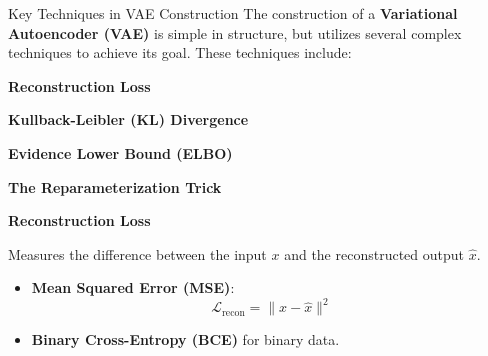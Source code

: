 \documentclass{beamer}
\begin{document}
\begin{frame}{Key Techniques in VAE Construction}
    The construction of a \textbf{Variational Autoencoder (VAE)} is simple in structure, but utilizes several complex techniques to achieve its goal. These techniques include:

    \vspace{1em}
    
    \begin{tcolorbox}[colback=blue!5!white, colframe=blue!75!black, fonttitle=\small, fontupper=\footnotesize]
        \textbf{Reconstruction Loss}
    \end{tcolorbox}

    \pause
    
    \begin{tcolorbox}[colback=teal!5!white, colframe=teal!75!black, fonttitle=\small, fontupper=\footnotesize]
        \textbf{Kullback-Leibler (KL) Divergence}
    \end{tcolorbox}

    \pause
    
    \begin{tcolorbox}[colback=purple!5!white, colframe=purple!75!black, fonttitle=\small, fontupper=\footnotesize]
        \textbf{Evidence Lower Bound (ELBO)}
    \end{tcolorbox}

    \pause

    \begin{tcolorbox}[colback=orange!5!white, colframe=orange!75!black, fonttitle=\small, fontupper=\footnotesize]
        \textbf{The Reparameterization Trick}
    \end{tcolorbox}
\end{frame}

\begin{frame}{\textbf{Reconstruction Loss}}
    \begin{tcolorbox}[colback=red!20!white, colframe=red!70!black, title=\textbf{Reconstruction Loss}]
        Measures the difference between the input \( x \) and the reconstructed output \( \hat{x} \).
    \end{tcolorbox}

    \pause

    \begin{tcolorbox}[colback=teal!10!white, colframe=teal!70!black, title=\textbf{Common Metrics}]
        \begin{itemize}
            \item \textbf{Mean Squared Error (MSE)}:
                \[
                \mathcal{L}_{\text{recon}} = \| x - \hat{x} \|^2
                \]
            \item \textbf{Binary Cross-Entropy (BCE)} for binary data.
        \end{itemize}
    \end{tcolorbox}    
\end{frame}  
\end{document}
